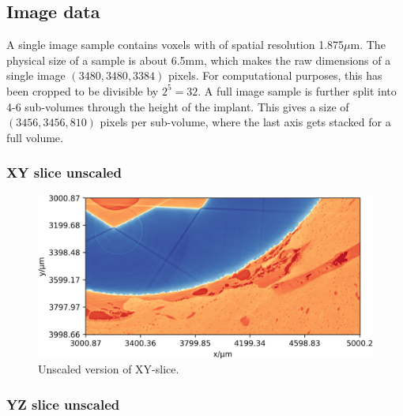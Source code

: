 
\subsection{Image data}

A single image sample contains voxels with of spatial resolution 1.875$\mu$m. The physical size of
a sample is about 6.5mm, which makes the raw dimensions of a single image $(3480,3480,3384)$ pixels.
For computational purposes, this has been cropped to be divisible by $2^5=32$. A full image sample
is further split into 4-6 sub-volumes through the height of the implant. This gives a size of $(3456,3456,810)$ pixels per sub-volume, where the last axis gets stacked for a full volume.



\subsubsection*{XY slice unscaled}

\begin{figure}%
\centering
\includegraphics[width=\textwidth]{figures/770c_pag-bic-xy-1x.png}
\caption{Unscaled version of XY-slice.}
\label{fig:xy-slice}
\end{figure}

\subsubsection*{YZ slice unscaled}

